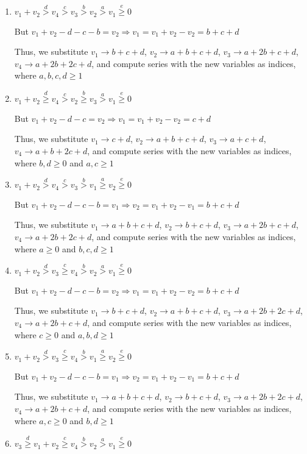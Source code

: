 \documentclass{article}
\begin{document}
\begin{enumerate}
\item 
$v_1+v_2\overset{d}{>}v_4\overset{c}{>}v_3\overset{b}{>}{v_2}\overset{a}{>}v_1\overset{e}{\geq}{0}$

But $v_1+v_2-d-c-b=v_2\Rightarrow{v_1=v_1+v_2-v_2=b+c+d}$

Thus, we substitute 
$v_1\rightarrow{b+c+d}$, $v_2\rightarrow{a+b+c+d}$, $v_3\rightarrow{a+2b+c+d}$, $v_4\rightarrow{a+2b+2c+d}$, and compute series with the new variables as indices, where $a,b,c,d\geq{1}$

\item 
$v_1+v_2\overset{d}{\geq}v_4\overset{c}{>}v_2\overset{b}{\geq}{v_3}\overset{a}{>}v_1\overset{e}{\geq}{0}$

But $v_1+v_2-d-c=v_2\Rightarrow{v_1=v_1+v_2-v_2=c+d}$

Thus, we substitute 
$v_1\rightarrow{c+d}$, $v_2\rightarrow{a+b+c+d}$, $v_3\rightarrow{a+c+d}$, $v_4\rightarrow{a+b+2c+d}$, and compute series with the new variables as indices, where $b,d\geq{0}$ and $a,c\geq{1}$

\item 
$v_1+v_2\overset{d}{>}v_4\overset{c}{>}v_3\overset{b}{>}{v_1}\overset{a}{\geq}v_2\overset{e}{\geq}{0}$

But $v_1+v_2-d-c-b=v_1\Rightarrow{v_2=v_1+v_2-v_1=b+c+d}$

Thus, we substitute 
$v_1\rightarrow{a+b+c+d}$, $v_2\rightarrow{b+c+d}$, $v_3\rightarrow{a+2b+c+d}$, $v_4\rightarrow{a+2b+2c+d}$, and compute series with the new variables as indices, where $a\geq{0}$ and $b,c,d\geq{1}$

\item 
$v_1+v_2\overset{d}{>}v_3\overset{c}{\geq}v_4\overset{b}{>}{v_2}\overset{a}{>}v_1\overset{e}{\geq}{0}$

But $v_1+v_2-d-c-b=v_2\Rightarrow{v_1=v_1+v_2-v_2=b+c+d}$

Thus, we substitute 
$v_1\rightarrow{b+c+d}$, $v_2\rightarrow{a+b+c+d}$, $v_3\rightarrow{a+2b+2c+d}$, $v_4\rightarrow{a+2b+c+d}$, and compute series with the new variables as indices, where $c\geq{0}$ and $a,b,d\geq{1}$
\item 
$v_1+v_2\overset{d}{>}v_3\overset{c}{\geq}v_4\overset{b}{>}{v_1}\overset{a}{\geq}v_2\overset{e}{\geq}{0}$

But $v_1+v_2-d-c-b=v_1\Rightarrow{v_2=v_1+v_2-v_1=b+c+d}$

Thus, we substitute 
$v_1\rightarrow{a+b+c+d}$, $v_2\rightarrow{b+c+d}$, $v_3\rightarrow{a+2b+2c+d}$, $v_4\rightarrow{a+2b+c+d}$, and compute series with the new variables as indices, where $a,c\geq{0}$ and $b,d\geq{1}$
\item 
$v_3\overset{d}{\geq}v_1+v_2\overset{c}{\geq}v_4\overset{b}{>}{v_2}\overset{a}{>}v_1\overset{e}{\geq}{0}$


\end{enumerate}
\end{document}
